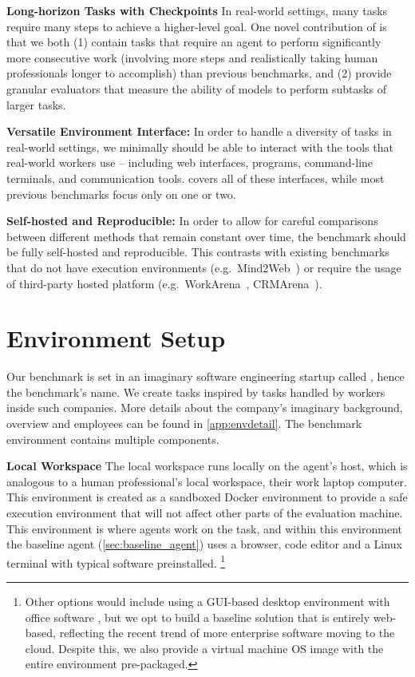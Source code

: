\documentclass{article}
\begin{document}
\noindent \textbf{Long-horizon Tasks with Checkpoints} \quad In real-world settings, many tasks require many steps to achieve a higher-level goal. One novel contribution of \tac is that we both (1) contain tasks that require an agent to perform significantly more consecutive work (\ie involving more steps and realistically taking human professionals longer to accomplish) than previous benchmarks, and (2) provide granular evaluators that measure the ability of models to perform subtasks of larger tasks.


\noindent \textbf{Versatile Environment Interface:} \quad In order to handle a diversity of tasks in real-world settings, we minimally should be able to interact with the tools that real-world workers use -- including web interfaces, programs, command-line terminals, and communication tools. \tac covers all of these interfaces, while most previous benchmarks focus only on one or two.

\noindent \textbf{Self-hosted and Reproducible:} \quad In order to allow for careful comparisons between different methods that remain constant over time, the benchmark should be fully self-hosted and reproducible. This contrasts with existing benchmarks that do not have execution environments (e.g.~Mind2Web~\citep{deng2023mindweb}) or require the usage of third-party hosted platform (e.g.~WorkArena~\citep{workarena2024}, CRMArena~\citep{huang2024crmarena}).


\section{\tac Environment Setup}
\label{sec:environment}

Our benchmark is set in an imaginary software engineering startup called \tac, hence the benchmark's name. 
We create tasks inspired by tasks handled by workers inside such companies.
More details about the company's imaginary background, overview and employees can be found in \autoref{app:envdetail}.
The benchmark environment contains multiple components. 

\noindent \textbf{Local Workspace} \quad
The local workspace runs locally on the agent's host, which is analogous to a human professional's local workspace, \eg their work laptop computer.
This environment is created as a sandboxed Docker environment to provide a safe execution environment that will not affect other parts of the evaluation machine. %
This environment is where agents work on the task, and within this environment the \tac baseline agent (\autoref{sec:baseline_agent}) uses a browser, code editor and a Linux terminal with typical software preinstalled.%
\footnote{
Other options would include using a GUI-based desktop environment with office software \citep{xie2024osworld}, but we opt to build a baseline solution that is entirely web-based, reflecting the recent trend of more enterprise software moving to the cloud. Despite this, we also provide a virtual machine OS image with the entire environment pre-packaged.
}
\end{document}
